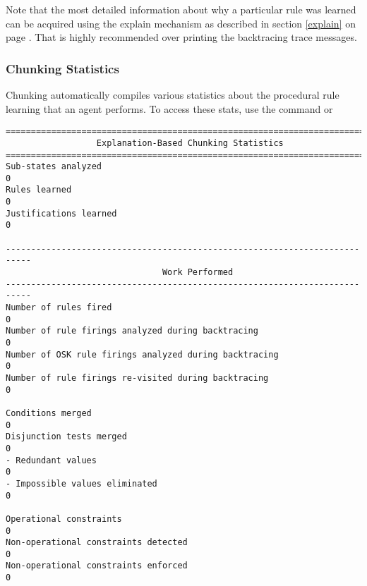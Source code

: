 Note that the most detailed information about why a particular rule was learned can be acquired using the explain mechanism as described in section \ref{explain} on page \pageref{explain}.  That is highly recommended over printing the backtracing trace messages.

\subsubsection{Chunking Statistics}

Chunking automatically compiles various statistics about the procedural rule learning that an agent performs.  To access these stats, use the command  or 

\begin{center}
\begin{Verbatim}[fontsize=\small]
===========================================================================
                  Explanation-Based Chunking Statistics
===========================================================================
Sub-states analyzed                                                    0
Rules learned                                                          0
Justifications learned                                                 0

---------------------------------------------------------------------------
                               Work Performed
---------------------------------------------------------------------------
Number of rules fired                                                  0
Number of rule firings analyzed during backtracing                     0
Number of OSK rule firings analyzed during backtracing                 0
Number of rule firings re-visited during backtracing                   0

Conditions merged                                                      0
Disjunction tests merged                                               0
- Redundant values                                                     0
- Impossible values eliminated                                         0

Operational constraints                                                0
Non-operational constraints detected                                   0
Non-operational constraints enforced                                   0


\end{Verbatim}
\end{center}
